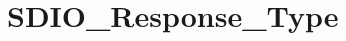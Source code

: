 \hypertarget{group___s_d_i_o___response___type}{\section{S\-D\-I\-O\-\_\-\-Response\-\_\-\-Type}
\label{group___s_d_i_o___response___type}
}
